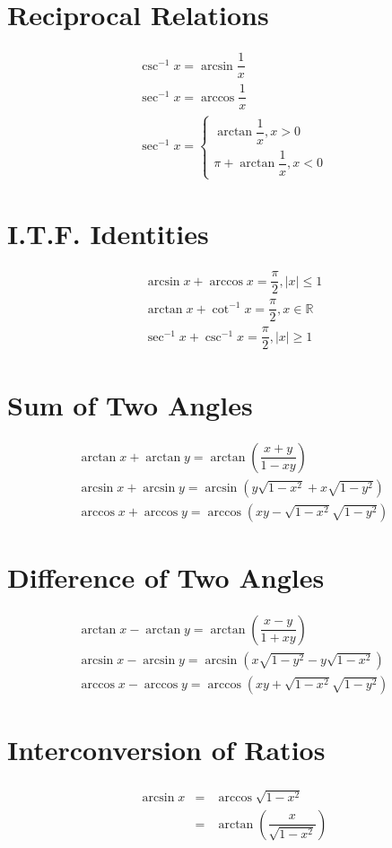 \section{Reciprocal Relations}
\begin{align}
	\csc^{-1} x=\arcsin \dfrac{1}{x}\\
	\sec^{-1} x=\arccos \dfrac{1}{x}\\
	\sec^{-1} x=\begin{cases}
		\arctan \dfrac{1}{x}, x>0\\
		\pi+\arctan \dfrac{1}{x}, x<0
	\end{cases}
\end{align}


\section{I.T.F. Identities}
\begin{align}
	\arcsin x+\arccos x=\dfrac{\pi}{2}, \lvert x \rvert \leq 1\\
	\arctan x+\cot^{-1} x=\dfrac{\pi}{2}, x\in\mathbb{R}\\
	\sec^{-1} x+\csc^{-1} x=\dfrac{\pi}{2}, \lvert x \rvert \geq 1
\end{align}


\section{Sum of Two Angles}
\begin{align}
	\arctan x+\arctan y=\arctan \left(\dfrac{x+y}{1-xy}\right)\\
	\arcsin x+\arcsin y=\arcsin (y\sqrt{1-x^2}+x\sqrt{1-y^2})\\
	\arccos x+\arccos y=\arccos (xy-\sqrt{1-x^2}\sqrt{1-y^2})
\end{align}


\section{Difference of Two Angles}
\begin{align}
	\arctan x-\arctan y=\arctan \left(\dfrac{x-y}{1+xy}\right)\\
	\arcsin x-\arcsin y=\arcsin (x\sqrt{1-y^2}-y\sqrt{1-x^2})\\
	\arccos x-\arccos y=\arccos (xy+\sqrt{1-x^2}\sqrt{1-y^2})
\end{align}


\section{Interconversion of Ratios}
\begin{equation}
	\begin{aligned}
		\begin{split}
			\arcsin x & = & \arccos \sqrt{1-x^2}\\
			& = & \arctan \left(\dfrac{x}{\sqrt{1-x^2}}\right)
		\end{split}
	\end{aligned}
\end{equation}

